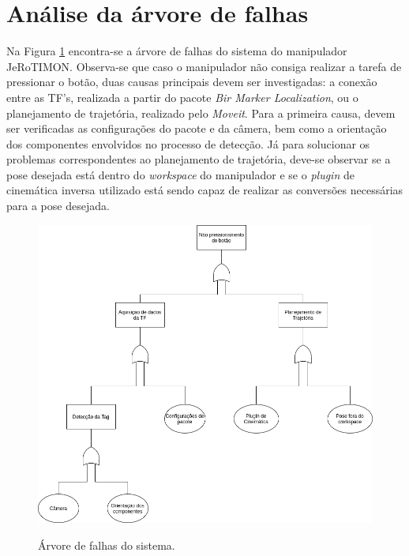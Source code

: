\section{Análise da árvore de falhas}
\label{sec:fta}

Na Figura \ref{fig:arvore_falha} encontra-se a árvore de falhas do sistema do manipulador JeRoTIMON. Observa-se que caso o manipulador não consiga realizar a tarefa de pressionar o botão, duas causas principais devem ser investigadas: a conexão entre as TF's, realizada a partir do pacote \textit{Bir Marker Localization}, ou o planejamento de trajetória, realizado pelo \textit{Moveit}. Para a primeira causa, devem ser verificadas as configurações do pacote e da câmera, bem como a orientação dos componentes envolvidos no processo de detecção. Já para solucionar os problemas correspondentes ao planejamento de trajetória, deve-se observar se a pose desejada está dentro do \textit{workspace} do manipulador e se o \textit{plugin} de cinemática inversa utilizado está sendo capaz de realizar as conversões necessárias para a pose desejada. 

\begin{figure}[H]
  \centering
  \caption{Árvore de falhas do sistema.}
  \includegraphics[scale=0.5]{images/arvore_falhas.png}
  \label{fig:arvore_falha}
\end{figure}
